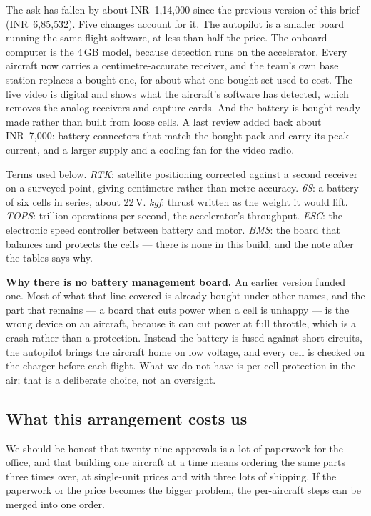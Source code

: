 \documentclass[11pt,a4paper]{article}
\newcommand{\rs}[1]{\mbox{INR~#1}}
\begin{document}
The ask has fallen by about \rs{1{,}14{,}000} since the previous version of
this brief (\rs{6{,}85{,}532}). Five changes account for it. The autopilot is a
smaller board running the same flight software, at less than half the price. The
onboard computer is the 4\,GB model, because detection runs on the accelerator.
Every aircraft now carries a centimetre-accurate receiver, and the team's own
base station replaces a bought one, for about what one bought set used to cost.
The live video is digital and shows what the aircraft's software has detected,
which removes the analog receivers and capture cards. And the battery is bought
ready-made rather than built from loose cells. A last review added back about
\rs{7{,}000}: battery connectors that match the bought pack and carry its peak
current, and a larger supply and a cooling fan for the video radio.

Terms used below. \emph{RTK}: satellite positioning corrected against
a second receiver on a surveyed point, giving centimetre rather than metre
accuracy. \emph{6S}: a battery of six cells in series, about 22\,V. \emph{kgf}: thrust written as the weight it would lift.
\emph{TOPS}: trillion operations per second, the accelerator's throughput.
\emph{ESC}: the electronic speed controller between battery and motor.
\emph{BMS}: the board that balances and protects the cells --- there is none
in this build, and the note after the tables says why.



\textbf{Why there is no battery management board.} An earlier version funded
one. Most of what that line covered is already bought under other names, and
the part that remains --- a board that cuts power when a cell is unhappy --- is
the wrong device on an aircraft, because it can cut power at full throttle,
which is a crash rather than a protection. Instead the battery is fused against
short circuits, the autopilot brings the aircraft home on low voltage, and
every cell is checked on the charger before each flight. What we do not have is
per-cell protection in the air; that is a deliberate choice, not an oversight.

\subsection{What this arrangement costs us}

We should be honest that twenty-nine approvals is a lot of paperwork for the office,
and that building one aircraft at a time means ordering the same parts three
times over, at single-unit prices and with three lots of shipping. If the
paperwork or the price becomes the bigger problem, the per-aircraft steps can
be merged into one order.
\end{document}
